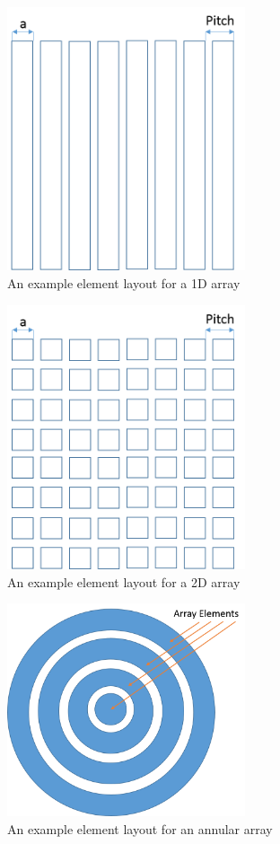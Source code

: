 \begin{figure}[htp]
\centering
		\includegraphics[width=70mm]{Array_1D.png}
		\caption{An example element layout for a 1D array}
		\label{fig:1D_array}
\end{figure}

\begin{figure}[htp]
\centering
		\includegraphics[width=70mm]{Array_2D.png}
		\caption{An example element layout for a 2D array}
		\label{fig:2D_array}
\end{figure}

\begin{figure}[htp]
\centering
		\includegraphics[width=70mm]{Array_annular.png}
		\caption{An example element layout for an annular array}
		\label{fig:annular_array}
\end{figure}

